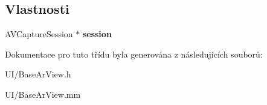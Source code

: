 \subsection*{Vlastnosti}
\begin{DoxyCompactItemize}
\item 
\hypertarget{interface_base_ar_view_a8c28981c0e1982d5de9ff06241c01ead}{A\-V\-Capture\-Session $\ast$ {\bfseries session}}\label{d5/d64/interface_base_ar_view_a8c28981c0e1982d5de9ff06241c01ead}

\end{DoxyCompactItemize}


Dokumentace pro tuto třídu byla generována z následujících souborů\-:\begin{DoxyCompactItemize}
\item 
U\-I/Base\-Ar\-View.\-h\item 
U\-I/Base\-Ar\-View.\-mm\end{DoxyCompactItemize}
